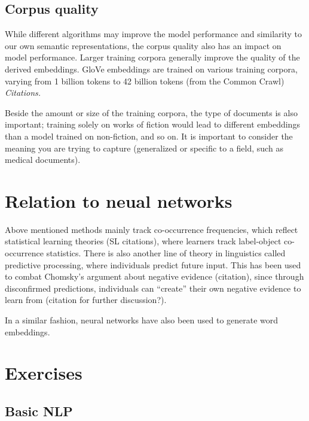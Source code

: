 \subsection{Corpus quality}

While different algorithms may improve the model performance and similarity to our own semantic representations, the corpus quality also has an impact on model performance.
Larger training corpora generally improve the quality of the derived embeddings. 
GloVe embeddings are trained on various training corpora, varying from 1 billion tokens to 42 billion tokens (from the Common Crawl) \textit{Citations.}

Beside the amount or size of the training corpora, the type of documents is also important; training solely on works of fiction would lead to different embeddings than a model trained on non-fiction, and so on. It is important to consider the meaning you are trying to capture (generalized or specific to a field, such as medical documents).

\section{Relation to neual networks}
Above mentioned methods mainly track co-occurrence frequencies, which reflect statistical learning theories (SL citations), where learners track label-object co-occurrence statistics.
There is also another line of theory in linguistics called predictive processing, where individuals predict future input. This has been used to combat Chomsky's argument about negative evidence (citation), since through disconfirmed predictions, individuals can ``create'' their own negative evidence to learn from (citation for further discussion?).

In a similar fashion, neural networks have also been used to generate word embeddings.





\section{Exercises}

\subsection{Basic NLP}

